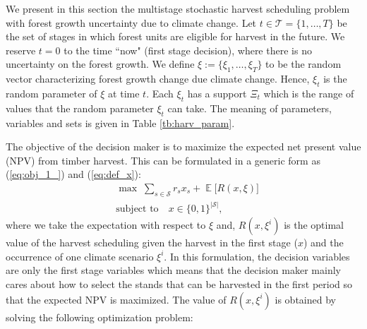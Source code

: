 \documentclass[forests,article,submit,moreauthors,pdftex]{Definitions/mdpi}
\begin{document}
We present in this section the multistage stochastic harvest scheduling problem with forest growth uncertainty due to climate change. Let $ t \in \mathcal{T}=\{1,\dots, T\}$ be the set of stages in which forest units are eligible for harvest in the future. We reserve $t=0$ to the time ``now" (first stage decision), where there is no uncertainty on the forest growth. We define $\xi := \{ \xi_1, \dots, \xi_T \}$ to be the random vector characterizing forest growth change due climate change. Hence, $\xi_t$ is the random parameter of $\xi$ at time $t$. Each $\xi_t$ has a support  $\Xi_t$ which is the range of values that the random parameter $\xi_t$ can take. 
The meaning of parameters, variables and sets is given in Table \ref{tb:harv_param}.

The objective of the decision maker is to maximize the expected net present value (NPV) from timber harvest. This can be formulated in a generic form as (\ref{eq:obj_1_}) and (\ref{eq:def_x}):
\begin{align}
    & \max \; \sum_{s \in \mathcal{S}}r_{s} x_{s} + \operatorname{\mathbb{E}}\Big[ R(x, \xi) \Big] \label{eq:obj_1_}\\
& \text{subject to} \quad
 x \in \{0, 1\}^{|\mathcal{S}|}, \label{eq:def_x}
\end{align}
where we take the expectation with respect to $\xi$ and,  $ R(x, \xi^{i})$ is the optimal value of the harvest scheduling given the harvest in the first stage ($x$) and the occurrence of one climate scenario $\xi^i$. In this formulation, the decision variables are only the first stage variables which means that the decision maker mainly cares about how to select the stands that can be harvested in the first period so that the expected NPV is maximized. 
The value of $ R(x, \xi^{i})$ is obtained by solving the following optimization problem:
\end{document}
